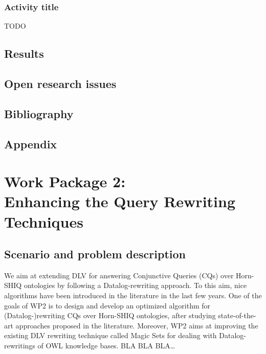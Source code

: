 \documentclass[oneside]{book}
\begin{document}
\section{Activity title}
TODO
\chapter{Results}
\chapter{Open research issues}
\chapter{Bibliography}
\chapter{Appendix}



\setcounter{chapter}{0}

\part*{Work Package 2:\\Enhancing the Query Rewriting Techniques}

\chapter{Scenario and problem description}

We aim at extending DLV for answering Conjunctive Queries (CQs) over Horn-SHIQ ontologies by following a Datalog-rewriting approach. To this aim, nice algorithms have been introduced in the literature in the last few years. One of the goals of WP2 is to design and develop an optimized algorithm for (Datalog-)rewriting CQs over Horn-SHIQ ontologies, after studying state-of-the-art approaches proposed in the literature. Moreover, WP2 aims at improving the existing DLV rewriting technique called Magic Sets for dealing with Datalog-rewritings of OWL knowledge bases. 
BLA BLA BLA…
\end{document}
